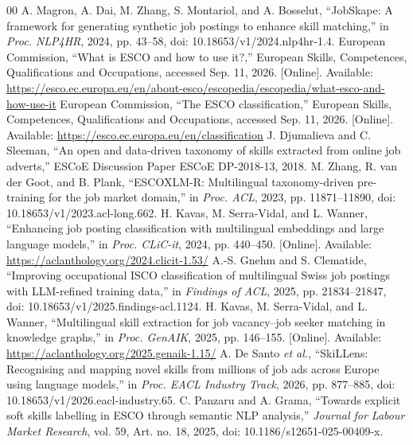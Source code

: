 \documentclass[conference]{IEEEtran}
\begin{document}
\begin{thebibliography}{00}
 A. Magron, A. Dai, M. Zhang, S. Montariol, and A. Bosselut, ``JobSkape: A framework for generating synthetic job postings to enhance skill matching,'' in \emph{Proc. NLP4HR}, 2024, pp. 43--58, doi: 10.18653/v1/2024.nlp4hr-1.4.
 European Commission, ``What is ESCO and how to use it?,'' European Skills, Competences, Qualifications and Occupations, accessed Sep. 11, 2026. [Online]. Available: \url{https://esco.ec.europa.eu/en/about-esco/escopedia/escopedia/what-esco-and-how-use-it}
 European Commission, ``The ESCO classification,'' European Skills, Competences, Qualifications and Occupations, accessed Sep. 11, 2026. [Online]. Available: \url{https://esco.ec.europa.eu/en/classification}
 J. Djumalieva and C. Sleeman, ``An open and data-driven taxonomy of skills extracted from online job adverts,'' ESCoE Discussion Paper ESCoE DP-2018-13, 2018.
 M. Zhang, R. van der Goot, and B. Plank, ``ESCOXLM-R: Multilingual taxonomy-driven pre-training for the job market domain,'' in \emph{Proc. ACL}, 2023, pp. 11871--11890, doi: 10.18653/v1/2023.acl-long.662.
 H. Kavas, M. Serra-Vidal, and L. Wanner, ``Enhancing job posting classification with multilingual embeddings and large language models,'' in \emph{Proc. CLiC-it}, 2024, pp. 440--450. [Online]. Available: \url{https://aclanthology.org/2024.clicit-1.53/}
 A.-S. Gnehm and S. Clematide, ``Improving occupational ISCO classification of multilingual Swiss job postings with LLM-refined training data,'' in \emph{Findings of ACL}, 2025, pp. 21834--21847, doi: 10.18653/v1/2025.findings-acl.1124.
 H. Kavas, M. Serra-Vidal, and L. Wanner, ``Multilingual skill extraction for job vacancy--job seeker matching in knowledge graphs,'' in \emph{Proc. GenAIK}, 2025, pp. 146--155. [Online]. Available: \url{https://aclanthology.org/2025.genaik-1.15/}
 A. De Santo \emph{et al.}, ``SkiLLens: Recognising and mapping novel skills from millions of job ads across Europe using language models,'' in \emph{Proc. EACL Industry Track}, 2026, pp. 877--885, doi: 10.18653/v1/2026.eacl-industry.65.
 C. Panzaru and A. Grama, ``Towards explicit soft skills labelling in ESCO through semantic NLP analysis,'' \emph{Journal for Labour Market Research}, vol. 59, Art. no. 18, 2025, doi: 10.1186/s12651-025-00409-x.
\end{thebibliography}
\end{document}
